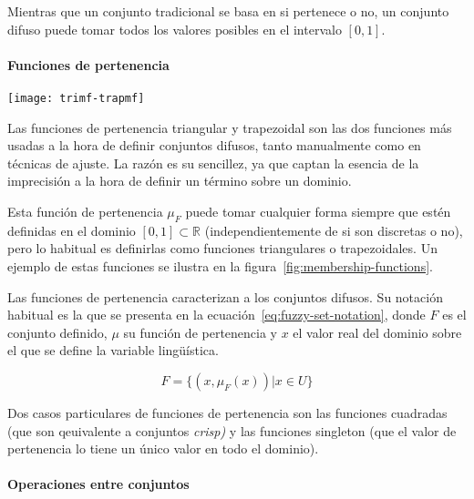 Mientras que un conjunto tradicional se basa en si pertenece o no, un conjunto difuso puede tomar todos los valores posibles en el intervalo $[0, 1]$.

\paragraph{Funciones de pertenencia}

\begin{marginfigure}
	\centering
	\texttt{[image: trimf-trapmf]}
	\caption[Gráfica de funciones de pertenencia triangular y trapezoidal]{Las funciones de pertenencia triangular y trapezoidal son las dos funciones más usadas a la hora de definir conjuntos difusos, tanto manualmente como en técnicas de ajuste. La razón es su sencillez, ya que captan la esencia de la imprecisión a la hora de definir un término sobre un dominio.}
	\label{fig:trimf-trapmf}
\end{marginfigure}

Esta función de pertenencia $\mu_F$ puede tomar cualquier forma siempre que estén definidas en el dominio $[0, 1] \subset \mathbb{R}$ (independientemente de si son discretas o no), pero lo habitual es definirlas como funciones triangulares o trapezoidales. Un ejemplo de estas funciones se ilustra en la figura~\ref{fig:membership-functions}.

Las funciones de pertenencia caracterizan a los conjuntos difusos. Su notación habitual es la que se presenta en la ecuación~\ref{eq:fuzzy-set-notation}, donde $F$ es el conjunto definido, $\mu$ su función de pertenencia y $x$ el valor real del dominio sobre el que se define la variable lingüística.

\begin{equation}
	F = \{(x, \mu_F(x)) | x \in U\}
	\label{eq:fuzzy-set-notation}
\end{equation}

Dos casos particulares de funciones de pertenencia son las funciones cuadradas (que son qeuivalente a conjuntos \textit{crisp)} y las funciones singleton (que el valor de pertenencia lo tiene un único valor en todo el dominio).

\paragraph{Operaciones entre conjuntos}

